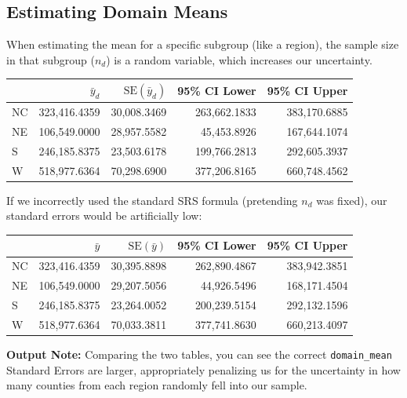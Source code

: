 \documentclass[
  letterpaper,
  DIV=11,
  numbers=noendperiod]{scrreprt}
\renewcommand{\[}{\begin{equation}}
\renewcommand{\]}{\end{equation}}
\begin{document}
\subsection{Estimating Domain Means}\label{estimating-domain-means}

When estimating the mean for a specific subgroup (like a region), the
sample size in that subgroup (\(n_d\)) is a random variable, which
increases our uncertainty.

\begin{table}
\fontsize{12.0pt}{14.0pt}\selectfont
\begin{tabular*}{0.7\linewidth}{@{\extracolsep{\fill}}l|rrrr}
\toprule
 & \(\bar{y}_{d}\) & \(\mathrm{SE}(\bar{y}_{d})\) & 95\% CI Lower & 95\% CI Upper \\ 
\midrule\addlinespace[2.5pt]
NC & 323,416.4359 & 30,008.3469 & 263,662.1833 & 383,170.6885 \\ 
NE & 106,549.0000 & 28,957.5582 & 45,453.8926 & 167,644.1074 \\ 
S & 246,185.8375 & 23,503.6178 & 199,766.2813 & 292,605.3937 \\ 
W & 518,977.6364 & 70,298.6900 & 377,206.8165 & 660,748.4562 \\ 
\bottomrule
\end{tabular*}
\end{table}

If we incorrectly used the standard SRS formula (pretending \(n_d\) was
fixed), our standard errors would be artificially low:

\begin{table}
\fontsize{12.0pt}{14.0pt}\selectfont
\begin{tabular*}{0.7\linewidth}{@{\extracolsep{\fill}}l|rrrr}
\toprule
 & \(\bar{y}\) & \(\mathrm{SE}(\bar{y})\) & 95\% CI Lower & 95\% CI Upper \\ 
\midrule\addlinespace[2.5pt]
NC & 323,416.4359 & 30,395.8898 & 262,890.4867 & 383,942.3851 \\ 
NE & 106,549.0000 & 29,207.5056 & 44,926.5496 & 168,171.4504 \\ 
S & 246,185.8375 & 23,264.0052 & 200,239.5154 & 292,132.1596 \\ 
W & 518,977.6364 & 70,033.3811 & 377,741.8630 & 660,213.4097 \\ 
\bottomrule
\end{tabular*}
\end{table}

\textbf{Output Note:} Comparing the two tables, you can see the correct
\texttt{domain\_mean} Standard Errors are larger, appropriately
penalizing us for the uncertainty in how many counties from each region
randomly fell into our sample.
\end{document}
